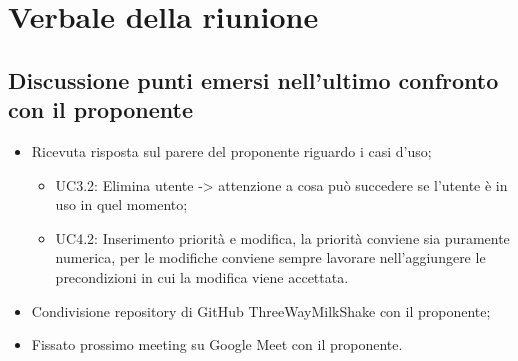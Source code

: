 \section{Verbale della riunione}
	\subsection{Discussione punti emersi nell'ultimo confronto con il proponente}
	\begin{itemize}
		\item Ricevuta risposta sul parere del proponente riguardo i casi d'uso;
			\begin{itemize}
				\item {UC3.2: }Elimina utente -> attenzione a cosa può succedere se l'utente è in uso in quel momento;
				\item {UC4.2: }Inserimento priorità e modifica, la priorità conviene sia puramente numerica, per le modifiche conviene sempre lavorare nell'aggiungere le precondizioni in cui la modifica viene accettata.
			\end{itemize}
		\item Condivisione repository di GitHub ThreeWayMilkShake con il proponente;
		\item Fissato prossimo meeting su Google Meet con il proponente.
	\end{itemize}

